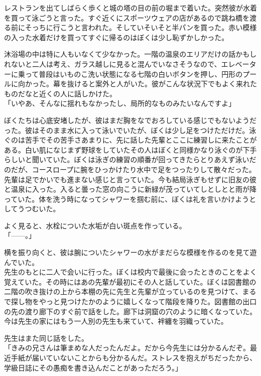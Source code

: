 \documentclass[b5j,twoside,twocolumn]{utarticle}
\begin{document}
レストランを出てしばらく歩くと城の塔の目の前の堀まで着いた。突然彼が水着を買って泳ごうと言った。すぐ近くにスポーツウェアの店があるので跳ね橋を渡る前にそっちに行こうと言われた。そしていそいそと半パンを買った。赤い模様の入った水着だけを買ってすぐに帰るのはぼくは少し恥ずかしかった。


沐浴場の中は特に人もいなくて少なかった。一階の温泉のエリアだけの話かもしれないと二人は考え、ガラス越しに見ると混んでいなさそうなので、エレベーターに乗って普段はいものこ洗い状態になる七階の白いボタンを押し、円形のプールに向かった。幕を抜けると案外と人がいた。彼がこんな状況下でもよく来れたものだなと近くの人に話しかけた。\\
「いやあ、そんなに揺れもなかったし、局所的なものみたいなんですよ」


ぼくたちは心底安堵したが、彼はまだ胸をなでおろしている感じでもないようだった。彼はそのまま水に入って泳いでいたが、ぼくは少し足をつけただけだ。泳ぐのは苦手でその苦手さあまりに、先に話した先輩とここに練習しに来たことがある。白い肌になじまず野球をしていたその人はぼくと同様かなり泳ぐのが下手らしいと聞いていた。ぼくは泳ぎの練習の順番が回ってきたらとりあえず泳いだのだが、コースロープに腕をひっかけたり水中で足をつったりして散々だった。先輩は足でかいでも進まない感じと言っていた。今も結局泳ぎもせずに旧友の彼と温泉に入った。入ると曇った窓の向こうに新緑が茂っていてしとしとと雨が降っていた。体を洗う時になってシャワーを掴む前に、ぼくは礼を言いかけようとしてうつむいた。


よく見ると、水栓についた水垢が白い斑点を作っている。\\
「\tbaselineshift=2.5pt------\tbaselineshift=4.0pt。」


横を振り向くと、彼は腕についたシャワーの水がまだらな模様を作るのを見て遊んでいた。\\



先生のもとに二人で会いに行った。ぼくは校内で最後に会ったときのことをよく覚えていた。その時にはあの先輩が最初にその人と話していた。ぼくは図書館の二階の吹き抜けの上から本棚の先に先生と先輩が立っているのを見つけて、まるで探し物をやっと見つけたかのように嬉しくなって階段を降りた。図書館の出口の先の渡り廊下のすぐ前で話をした。廊下は洞窟の穴のように暗くなっていた。今は先生の家にはもう一人別の先生も来ていて、袢纏を羽織っていた。


先生はまた同じ話をした。\\
「きみの兄さんは筆まめな人だったんだよ。だから今先生には分かるんだぞ。最近手紙が届いていないことからも分かるんだ。ストレスを抱えがちだったから、学級日誌にその愚痴を書き込んだことがあっただろう。」
\end{document}
